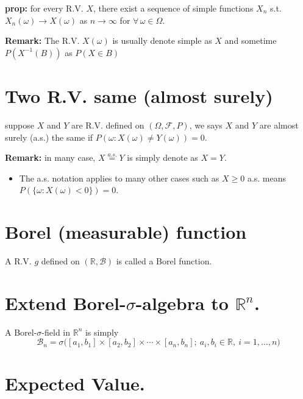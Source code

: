\documentclass[
  letterpaper,
  DIV=11,
  numbers=noendperiod]{scrreprt}
\providecommand{\tightlist}{%
  \setlength{\itemsep}{0pt}\setlength{\parskip}{0pt}}
\theoremstyle{definition}
\theoremstyle{plain}
\theoremstyle{plain}
\theoremstyle{definition}
\theoremstyle{plain}
\theoremstyle{plain}
\theoremstyle{remark}
\begin{document}
\textbf{prop:} for every R.V. \(X\), there exist a sequence of simple
functions \(X_n\) s.t. \(X_n(\omega) \to X(\omega)\) as \(n \to \infty\)
for \(\forall\, \omega \in \Omega\).

\textbf{Remark:} The R.V. \(X(\omega)\) is usually denote simple as
\(X\) and sometime \(P(X^{-1}(B))\) as \(P(X \in B)\)

\section{Two R.V. same (almost
surely)}\label{two-r.v.-same-almost-surely}

suppose \(X\) and \(Y\) are R.V. defined on
\((\Omega, \mathcal{F}, P)\), we says \(X\) and \(Y\) are almost surely
(a.s.) the same if \(P(\omega : X(\omega) \neq Y(\omega)) = 0\).

\textbf{Remark:} in many case, \(X \overset{a.s.}{=} Y\) is simply
denote as \(X = Y\).

\begin{itemize}
\tightlist
\item
  The a.s. notation applies to many other cases such as \(X \geq 0\)
  a.s. means \(P(\{\omega : X(\omega) < 0\}) = 0\).
\end{itemize}

\section{Borel (measurable) function}\label{borel-measurable-function}

A R.V. \(g\) defined on \((\mathbb{R}, \mathcal{B})\) is called a Borel
function.

\section{\texorpdfstring{Extend Borel-\(\sigma\)-algebra to
\(\mathbb{R}^n\).}{Extend Borel-\textbackslash sigma-algebra to \textbackslash mathbb\{R\}\^{}n.}}\label{extend-borel-sigma-algebra-to-mathbbrn.}

A Borel-\(\sigma\)-field in \(\mathbb{R}^n\) is simply \[
\mathcal{B}_n = \sigma\big( [a_1, b_1] \times [a_2, b_2] \times \cdots \times [a_n, b_n]; \ a_i, b_i \in \mathbb{R}, \ i = 1, \dots, n \big)
\]

\section{Expected Value.}\label{expected-value.}
\end{document}

